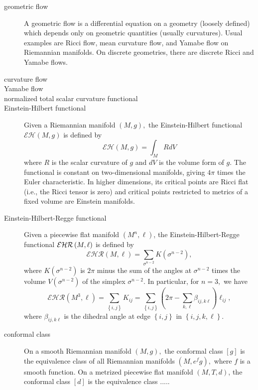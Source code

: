 \begin{description}
\item[geometric flow] A geometric flow is a differential equation on a
geometry (loosely defined) which depends only on geometric quantities
(usually curvatures). Usual examples are Ricci flow, mean curvature flow,
and Yamabe flow on Riemannian manifolds. On discrete geometries, there are
discrete Ricci and Yamabe flows.

\item[curvature flow] 

\item[Yamabe flow] 

\item[normalized total scalar curvature functional] 

\item[Einstein-Hilbert functional] Given a Riemannian manifold $\left(
M,g\right) ,$ the Einstein-Hilbert functional $\mathcal{EH}\left( M,g\right) 
$ is defined by 
\[
\mathcal{EH}\left( M,g\right) =\int_{M}RdV 
\]%
where $R$ is the scalar curvature of $g$ and $dV$ is the volume form of $g.$
The functional is constant on two-dimensional manifolds, giving $4\pi $
times the Euler characteristic. In higher dimensions, its critical points
are Ricci flat (i.e., the Ricci tensor is zero) and critical points
restricted to metrics of a fixed volume are Einstein manifolds.

\item[Einstein-Hilbert-Regge functional] Given a piecewise flat manifold $%
\left( M^{n},\ell \right) $, the Einstein-Hilbert-Regge functional $\mathcal{%
EHR}\left( M,\ell \right) $ is defined by 
\[
\mathcal{EHR}\left( M,\ell \right) =\sum_{\sigma ^{n-2}}K\left( \sigma
^{n-2}\right) , 
\]%
where $K\left( \sigma ^{n-2}\right) $ is $2\pi $ minus the sum of the angles
at $\sigma ^{n-2}$ times the volume $V\left( \sigma ^{n-2}\right) $ of the
simplex $\sigma ^{n-2}.$ In particular, for $n=3,$ we have 
\[
\mathcal{EHR}\left( M^{3},\ell \right) =\sum_{\left\{ i,j\right\}
}K_{ij}=\sum_{\left\{ i,j\right\} }\left( 2\pi -\sum_{k,\ell }\beta
_{ij,k\ell }\right) \ell _{ij}, 
\]%
where $\beta _{ij,k\ell }$ is the dihedral angle at edge $\left\{
i,j\right\} $ in $\left\{ i,j,k,\ell \right\} .$

\item[conformal class] On a smooth Riemannian manifold $\left( M,g\right) ,$
the conformal class $\left[ g\right] $ is the equivalence class of all
Riemannian manifolds $\left( M,e^{f}g\right) ,$ where $f$ is a smooth
function. On a metrized piecewise flat manifold $\left( M,T,d\right) $, the
conformal class $\left[ d\right] $ is the equivalence class .....


\end{description}
